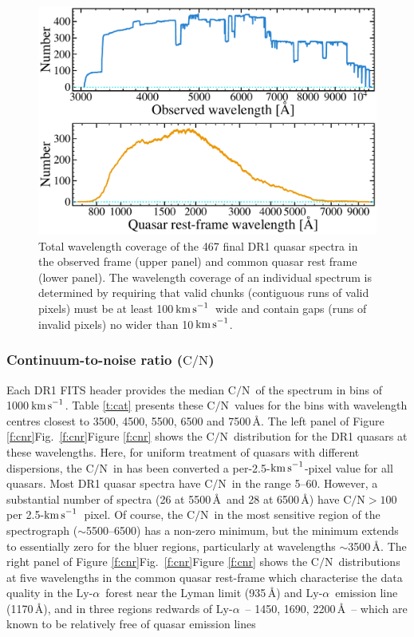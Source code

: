 \documentclass[fleqn,usenatbib,usedcolumn]{mnras}
\newcommand{\Tref}[1]{Table \ref{#1}}
\newcommand{\Fref}[1]{\ifhmode \ifnum\spacefactor=1001 Figure \ref{#1}\else Fig.\ \ref{#1}\fi \else Figure \ref{#1}\fi}
\newcommand{\kms}{\ensuremath{\textrm{km\,s}^{-1}}}
\newcommand{\CN}{\ensuremath{\textrm{C/N}}}
\newcommand{\lya}{\ensuremath{\textrm{Ly-}\alpha}}
\begin{document}
\begin{figure}
\begin{center}
\includegraphics[width=0.90\columnwidth]{DR1_wlcoverage.pdf}
\vspace{-1em}
\caption{Total wavelength coverage of the 467 final DR1 quasar spectra in the observed frame (upper panel) and common quasar rest frame (lower panel). The wavelength coverage of an individual spectrum is determined by requiring that valid chunks (contiguous runs of valid pixels) must be at least 100\,\kms\ wide and contain gaps (runs of invalid pixels) no wider than 10\,\kms.}
\label{f:wlcov}
\end{center}
\end{figure}

\subsubsection{Continuum-to-noise ratio (\CN)}\label{sss:CNR}

Each DR1 FITS header provides the median \CN\ of the spectrum in bins of 1000\,\kms. \Tref{t:cat} presents these \CN\ values for the bins with wavelength centres closest to 3500, 4500, 5500, 6500 and 7500\,\AA. The left panel of \Fref{f:cnr} shows the \CN\ distribution for the DR1 quasars at these wavelengths. Here, for uniform treatment of quasars with different dispersions, the \CN\ in has been converted a per-2.5-\kms-pixel value for all quasars. Most DR1 quasar spectra have \CN\ in the range 5--60. However, a substantial number of spectra (26 at 5500\,\AA\ and 28 at 6500\,\AA) have $\CN>100$\,per 2.5-\kms\ pixel. Of course, the \CN\ in the most sensitive region of the spectrograph ($\sim$5500--6500) has a non-zero minimum, but the minimum extends to essentially zero for the bluer regions, particularly at wavelengths $\sim$3500\,\AA. The right panel of \Fref{f:cnr} shows the \CN\ distributions at five wavelengths in the common quasar rest-frame which characterise the data quality in the \lya\ forest near the Lyman limit (935\,\AA) and \lya\ emission line (1170\,\AA), and in three regions redwards of \lya\ -- 1450, 1690, 2200\,\AA\ -- which are known to be relatively free of quasar emission lines \citep[e.g.][]{vandenBerk:2001:549,Murphy:2016:1043}
\end{document}
